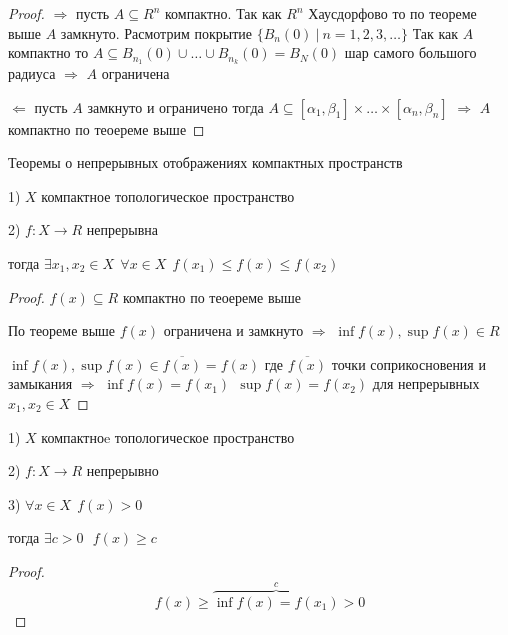 \begin{proof}
  $\Rightarrow$ пусть $A \subseteq R^n$ компактно. Так как $R^n$ Хаусдорфово
  то по теореме выше $A$ замкнуто. Расмотрим покрытие $\{B_n(0) ~ | ~
  n = 1,2,3, \ldots \}$ Так как $A$ компактно то $A \subseteq B_{n_1}(0) \cup
  \ldots \cup B_{n_k}(0) = B_N(0)$ шар самого большого радиуса
  $\Rightarrow$ $A$ ограничена

  $\Leftarrow$ пусть $A$ замкнуто и ограничено тогда $A \subseteq [\alpha_1,
  \beta_1] \times \ldots \times [\alpha_n, \beta_n]$ $\Rightarrow$ $A$ компактно
  по теоереме выше
\end{proof}

\begin{title}[\Large]
  Теоремы о непрерывных отображениях компактных пространств
\end{title}

\begin{theorem}[Вейерштрасса]
  1) $X$ компактное топологическое пространство

  2) $f: X \to R$ непрерывна

  тогда $\exists x_1, x_2 \in X ~~ \forall x \in X ~~
  f(x_1) \le f(x) \le f(x_2)$
\end{theorem}

\begin{proof}
  $f(x) \subseteq R$ компактно по теоереме выше

  По теореме выше $f(x)$ ограничена и замкнуто $\Rightarrow$ $\inf f(x),
  \sup f(x) \in R$

  $\inf f(x), \sup f(x) \in \overline{f(x)} = f(x)$ где $\overline{f(x)}$
  точки соприкосновения и замыкания $\Rightarrow$ $\inf f(x) = f(x_1) ~~
  \sup f(x) = f(x_2)$ для непрерывных $x_1, x_2 \in X$
\end{proof}

\begin{block}[Следствие]
  1) $X$ компактноe топологическое пространство

  2) $f: X \to R$ непрерывно

  3) $\forall x \in X ~~ f(x) > 0$

  тогда $\exists c > 0 ~~~ f(x) \ge c$
\end{block}

\begin{proof}
   $$
   f(x) \ge \overbrace{\inf f(x) = f(x_1)}^c > 0
   $$
\end{proof}